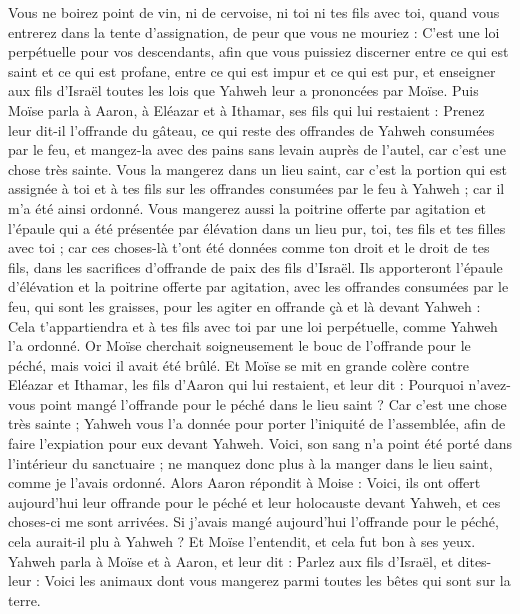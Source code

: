 \begin{multicols}{2}
Vous ne boirez point de vin, ni de cervoise, ni toi ni tes fils avec toi, quand vous entrerez dans la tente d'assignation, de peur que vous ne mouriez : C'est une loi perpétuelle pour vos descendants,
afin que vous puissiez discerner entre ce qui est saint et ce qui est profane, entre ce qui est impur et ce qui est pur,
et enseigner aux fils d'Israël toutes les lois que Yahweh leur a prononcées par Moïse.
Puis Moïse parla à Aaron, à Eléazar et à Ithamar, ses fils qui lui restaient : Prenez leur dit-il l'offrande du gâteau, ce qui reste des offrandes de Yahweh consumées par le feu, et mangez-la avec des pains sans levain auprès de l'autel, car c'est une chose très sainte.
Vous la mangerez dans un lieu saint, car c'est la portion qui est assignée à toi et à tes fils sur les offrandes consumées par le feu à Yahweh ; car il m'a été ainsi ordonné.
Vous mangerez aussi la poitrine offerte par agitation et l'épaule qui a été présentée par élévation dans un lieu pur, toi, tes fils et tes filles avec toi ; car ces choses-là t'ont été données comme ton droit et le droit de tes fils, dans les sacrifices d’offrande de paix des fils d'Israël.
Ils apporteront l'épaule d'élévation et la poitrine offerte par agitation, avec les offrandes consumées par le feu, qui sont les graisses, pour les agiter en offrande çà et là devant Yahweh : Cela t'appartiendra et à tes fils avec toi par une loi perpétuelle, comme Yahweh l'a ordonné.
Or Moïse cherchait soigneusement le bouc de l'offrande pour le péché, mais voici il avait été brûlé. Et Moïse se mit en grande colère contre Eléazar et Ithamar, les fils d'Aaron qui lui restaient, et leur dit :
Pourquoi n'avez-vous point mangé l'offrande pour le péché dans le lieu saint ? Car c'est une chose très sainte ; Yahweh vous l’a donnée pour porter l'iniquité de l'assemblée, afin de faire l’expiation pour eux devant Yahweh.
Voici, son sang n'a point été porté dans l’intérieur du sanctuaire ; ne manquez donc plus à la manger dans le lieu saint, comme je l'avais ordonné.
Alors Aaron répondit à Moise : Voici, ils ont offert aujourd'hui leur offrande pour le péché et leur holocauste devant Yahweh, et ces choses-ci me sont arrivées. Si j'avais mangé aujourd'hui l'offrande pour le péché, cela aurait-il plu à Yahweh ?
Et Moïse l'entendit, et cela fut bon à ses yeux.
\VerseOne{}Yahweh parla à Moïse et à Aaron, et leur dit :
Parlez aux fils d'Israël, et dites-leur : Voici les animaux dont vous mangerez parmi toutes les bêtes qui sont sur la terre.

\end{multicols}
